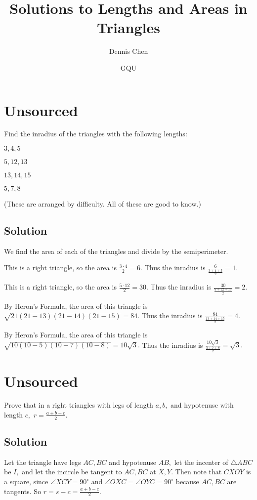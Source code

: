\documentclass[mast]{lucky}
\title{Solutions to Lengths and Areas in Triangles}
\author{Dennis Chen}
\date{GQU}
\begin{document}
\maketitle

\toc

\pagebreak\section{Unsourced}
Find the inradius of the triangles with the following lengths:
    
    \begin{itemize}
        \Item $3,4,5$
        
        \Item $5,12,13$
        
        \Item $13,14,15$
        
        \Item $5,7,8$
    \end{itemize}

    (These are arranged by difficulty. All of these are good to know.)
    
\subsection{Solution}
We find the area of each of the triangles and divide by the semiperimeter.
\begin{itemize}
\Item This is a right triangle, so the area is $\frac{3\cdot 4}{2}=6.$ Thus the inradius is $\frac{6}{\frac{3+4+5}{2}}=1.$

\Item This is a right triangle, so the area is $\frac{5\cdot 12}{2}=30.$ Thus the inradius is $\frac{30}{\frac{5+12+13}{2}}=2.$

\Item By Heron's Formula, the area of this triangle is $\sqrt{21(21-13)(21-14)(21-15)}=84.$ Thus the inradius is $\frac{84}{\frac{13+14+15}{2}}=4.$

\Item By Heron's Formula, the area of this triangle is $\sqrt{10(10-5)(10-7)(10-8)}=10\sqrt{3}.$ Thus the inradius is $\frac{10\sqrt{3}}{\frac{5+7+8}{2}}=\sqrt{3}.$
\end{itemize}

\pagebreak\section{Unsourced}
Prove that in a right triangles with legs of length $a,b,$ and hypotenuse with length $c,$ $r=\frac{a+b-c}{2}.$

\subsection{Solution}
Let the triangle have legs $AC,BC$ and hypotenuse $AB,$ let the incenter of $\triangle ABC$ be $I,$ and let the incircle be tangent to $AC,BC$ at $X,Y.$ Then note that $CXOY$ is a square, since $\angle XCY=90^{\circ}$ and $\angle OXC=\angle OYC=90^{\circ}$ because $AC,BC$ are tangents. So $r=s-c=\frac{a+b-c}{2}.$
\end{document}

